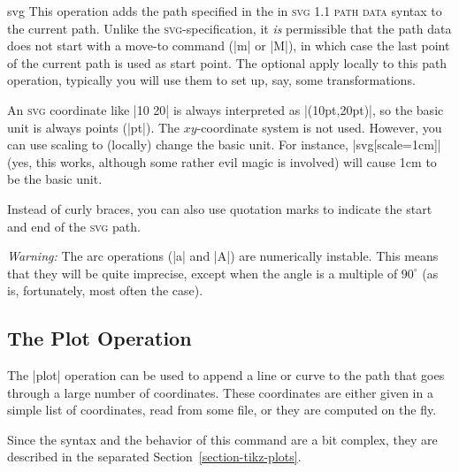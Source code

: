 \begin{pathoperation}{svg}{}
    This operation adds the path specified in the  in
    \textsc{svg 1.1 path data} syntax to the current path. Unlike the
    \textsc{svg}-specification, it \emph{is} permissible that the path data
    does not start with a move-to command (|m| or |M|), in which case the last
    point of the current path is used as start point. The optional
     apply locally to this path operation, typically you will use
    them to set up, say, some transformations.
\begin{codeexample}[preamble={\usetikzlibrary{svg.path}}]
\end{codeexample}

    An \textsc{svg} coordinate like |10 20| is always interpreted as
    |(10pt,20pt)|, so the basic unit is always points (|pt|). The
    $xy$-coordinate system is not used. However, you can use scaling to
    (locally) change the basic unit. For instance, |svg[scale=1cm]| (yes, this
    works, although some rather evil magic is involved) will cause 1cm to be
    the basic unit.

    Instead of curly braces, you can also use quotation marks to indicate the
    start and end of the \textsc{svg} path.

    \emph{Warning:} The arc operations (|a| and |A|) are numerically instable.
    This means that they will be quite imprecise, except when the angle is a
    multiple of $90^\circ$ (as is, fortunately, most often the case).
\end{pathoperation}


\subsection{The Plot Operation}

The |plot| operation can be used to append a line or curve to the path that
goes through a large number of coordinates. These coordinates are either given
in a simple list of coordinates, read from some file, or they are computed on
the fly.

Since the syntax and the behavior of this command are a bit complex, they are
described in the separated Section~\ref{section-tikz-plots}.


